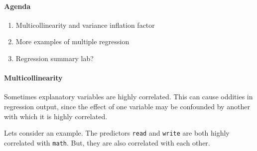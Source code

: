 \documentclass[10pt]{article}
\begin{document}


\paragraph{Agenda}
\begin{enumerate}
  \itemsep0em
  \item Multicollinearity and variance inflation factor
  \item More examples of multiple regression
  \item Regression summary lab?
\end{enumerate}

\paragraph{Multicollinearity}

Sometimes explanatory variables are highly correlated. This can cause oddities in regression output, since the effect of one variable may be confounded by another with which it is highly correlated.

Lets consider an example. The predictors \texttt{read} and \texttt{write} are both highly correlated with \texttt{math}. But, they are also correlated with each other.
\end{document}
